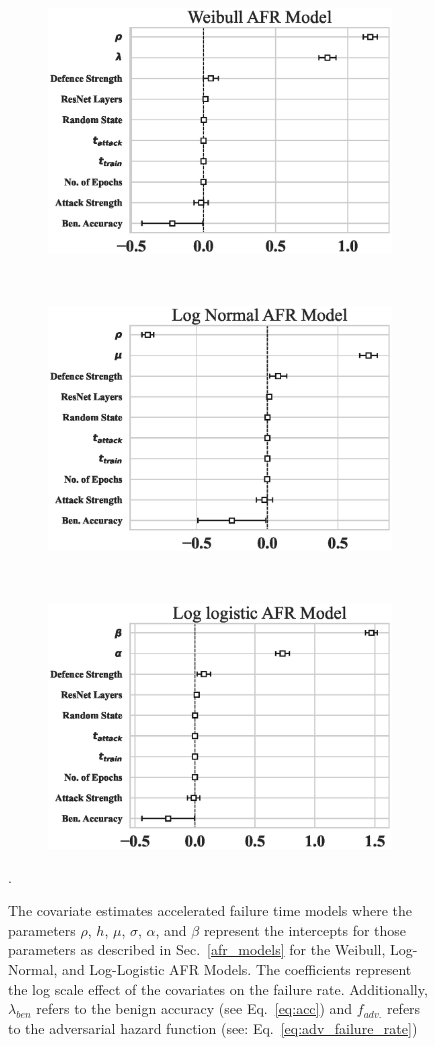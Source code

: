 \begin{figure}
	\begin{subfigure}
		\centering
		\includegraphics[width=.32\textwidth]{cifar100/weibull_aft.eps}
	\end{subfigure}%
	~
	\begin{subfigure}
		\centering
		\includegraphics[width=.32\textwidth]{cifar100/log_normal_aft.eps}
	\end{subfigure}
	~
	\begin{subfigure}
		\centering
		\includegraphics[width=.32\textwidth]{cifar100/log_logistic_aft.eps}
	\end{subfigure}

	\caption{The covariate estimates accelerated failure time models where the parameters $\rho$, $h$, $\mu$, $\sigma$, $\alpha$, and $\beta$ represent the intercepts for those parameters as described in Sec.~\ref{afr_models} for the Weibull, Log-Normal, and Log-Logistic AFR Models. The coefficients represent the log scale effect of the covariates on the failure rate. Additionally, $\lambda_{ben}$ refers to the benign accuracy (see Eq.~\ref{eq:acc}) and $f_{adv.}$ refers to the adversarial hazard function (see: Eq.~\ref{eq:adv_failure_rate})}.
	\label{fig:afr_models}
\end{figure}

% 
